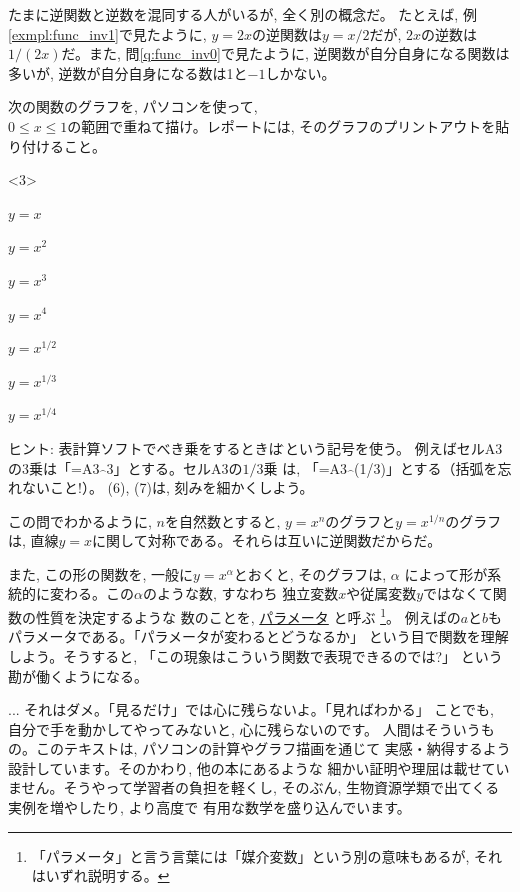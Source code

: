 たまに逆関数と逆数を混同する人がいるが, 全く別の概念だ。
たとえば, 例\ref{exmpl:func_inv1}で見たように, $y=2x$の逆関数は$y=x/2$だが, 
$2x$の逆数は$1/(2x)$だ。また, 問\ref{q:func_inv0}で見たように, 
逆関数が自分自身になる関数は多いが, 逆数が自分自身になる数は1と$-1$しかない。\\

\begin{q}\label{q:func_inv3} 次の関数のグラフを, パソコンを使って, \\
$0 \le x \le 1$の範囲で重ねて描け。レポートには, そのグラフのプリントアウトを貼り付けること。
\begin{edaenumerate}<3>
\item $y=x$
\item $y=x^2$
\item $y=x^3$
\item $y=x^4$
\item $y=x^{1/2}$
\item $y=x^{1/3}$
\item $y=x^{1/4}$
\end{edaenumerate}
ヒント: 表計算ソフトでべき乗をするときは\^ \,という記号を使う。
例えばセルA3の3乗は「=A3$\hat{\,\,\,}$3」とする。セルA3の$1/3$乗
は, 「=A3$\hat{\,\,\,}$(1/3)」とする（括弧を忘れないこと!）。
(6), (7)は, 刻みを細かくしよう。
\end{q}

この問でわかるように, $n$を自然数とすると, $y=x^n$のグラフと$y=x^{1/n}$のグラフは, 
直線$y=x$に関して対称である。それらは互いに逆関数だからだ。

また, この形の関数を, 一般に$y=x^\alpha$とおくと, そのグラフは, $\alpha$
によって形が系統的に変わる。この$\alpha$のような数, すなわち
独立変数$x$や従属変数$y$ではなくて関数の性質を決定するような
数のことを, \underline{パラメータ}
と呼ぶ
\footnote{「パラメータ」と言う言葉には「媒介変数」という別の意味もあるが, それはいずれ説明する。}。
例えばの$a$と$b$もパラメータである。「パラメータが変わるとどうなるか」
という目で関数を理解しよう。そうすると, 「この現象はこういう関数で表現できるのでは?」
という勘が働くようになる。\mv

\begin{faq}{\small{}
... それはダメ。「見るだけ」では心に残らないよ。「見ればわかる」
ことでも, 自分で手を動かしてやってみないと, 心に残らないのです。
人間はそういうもの。このテキストは, パソコンの計算やグラフ描画を通じて
実感・納得するよう設計しています。そのかわり, 他の本にあるような
細かい証明や理屈は載せていません。そうやって学習者の負担を軽くし, 
そのぶん, 生物資源学類で出てくる実例を増やしたり, より高度で
有用な数学を盛り込んでいます。}\end{faq}



